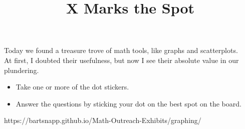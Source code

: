 \documentclass{../exhibit}
\title{X Marks the Spot}
\begin{document}
\begin{context}
  Today we found a treasure trove of math tools, like graphs and
  scatterplots.
  \\[1cm]
  At first, I doubted their usefulness, but now I see
  their absolute value in our plundering.
\end{context}

\begin{directions}
  \begin{itemize}
\item Take one or more of the dot stickers.
\item Answer the questions by sticking your dot on the best spot on the board.
  \end{itemize}
\end{directions}

\begin{example}
\end{example}

\begin{mathConnections}
  https://bartsnapp.github.io/Math-Outreach-Exhibits/graphing/
\end{mathConnections}
\end{document}
